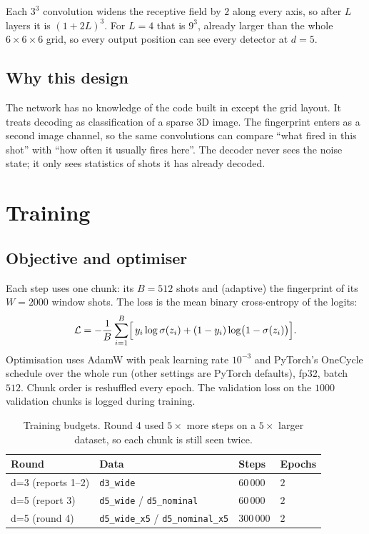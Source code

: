 \documentclass[11pt,a4paper]{article}
\newcommand{\code}[1]{\texttt{#1}}
\begin{document}
\noindent Each $3^3$ convolution widens the receptive field by $2$ along every axis, so after $L$ layers
it is $(1+2L)^3$. For $L=4$ that is $9^3$, already larger than the whole $6\times6\times6$ grid, so every
output position can see every detector at $d=5$.

\subsection{Why this design}
The network has no knowledge of the code built in except the grid layout. It treats decoding as
classification of a sparse 3D image. The fingerprint enters as a second image channel, so the same
convolutions can compare ``what fired in this shot'' with ``how often it usually fires here''. The
decoder never sees the noise state; it only sees statistics of shots it has already decoded.

\section{Training}\label{sec:training}

\subsection{Objective and optimiser}
Each step uses one chunk: its $B=512$ shots and (adaptive) the fingerprint of its $W=2000$ window shots.
The loss is the mean binary cross-entropy of the logits:
\begin{equation}
  \mathcal L = -\frac{1}{B}\sum_{i=1}^{B}\Bigl[\,y_i\log\sigma(z_i) + (1-y_i)\log\bigl(1-\sigma(z_i)\bigr)\Bigr].
\end{equation}
Optimisation uses AdamW with peak learning rate $10^{-3}$ and PyTorch's OneCycle schedule over the whole run
(other settings are PyTorch defaults), fp32, batch $512$. Chunk order is reshuffled every epoch. The
validation loss on the $1000$ validation chunks is logged during training.

\begin{table}[h]
\centering
\small
\begin{tabular}{llll}
\toprule
Round & Data & Steps & Epochs \\
\midrule
d=3 (reports 1--2) & \code{d3\_wide} & $60\,000$ & $2$ \\
d=5 (report 3) & \code{d5\_wide} / \code{d5\_nominal} & $60\,000$ & $2$ \\
d=5 (round 4) & \code{d5\_wide\_x5} / \code{d5\_nominal\_x5} & $300\,000$ & $2$ \\
\bottomrule
\end{tabular}
\caption{Training budgets. Round 4 used $5\times$ more steps on a $5\times$ larger dataset, so each chunk
is still seen twice.}
\end{table}
\end{document}
